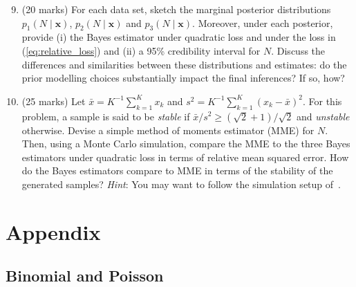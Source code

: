 \documentclass[a4paper,10pt, notitlepage]{report}
\begin{document}
\begin{enumerate}[label=\alph*)]
\setcounter{enumi}{8}
 \item (20 marks) For each data set, sketch the marginal posterior distributions $p_1(N \mid \boldsymbol{x})$, $p_2(N \mid \boldsymbol{x})$ and $p_3(N \mid \boldsymbol{x})$.
 Moreover, under each posterior,  provide (i) the Bayes estimator under quadratic loss and under the loss in (\ref{eq:relative_loss}) and (ii) a 95\% credibility interval for $N$.
 Discuss the differences and similarities between these distributions and
 estimates: do the prior modelling choices substantially impact the final
 inferences? If so, how?
 
 

 \item (25 marks) Let $\bar{x} = K^{-1}\sum_{k =1}^K x_k$ and $s^2 = K^{-1}\sum_{k =1}^K (x_k-\bar{x})^2$.
 For this problem, a sample is said to be \textit{stable} if $\bar{x}/s^2 \geq (\sqrt{2} + 1)/\sqrt{2}$ and \textit{unstable} otherwise.
 Devise a simple method of moments estimator (MME) for $N$.
 Then, using a Monte Carlo simulation, compare the MME to the three Bayes estimators under quadratic loss in terms of relative mean squared error. 
 How do the Bayes estimators compare to MME in terms of the stability of the generated samples? 
 \textit{Hint}: You may want to follow the simulation setup
 of~\cite{Carroll1985}. 
 
 

\end{enumerate}

\appendix
\section*{Appendix}
\renewcommand{\thesubsection}{\Alph{subsection}}

\subsection{Binomial and Poisson}
\label{sec:binomial-poisson}
\end{document}
